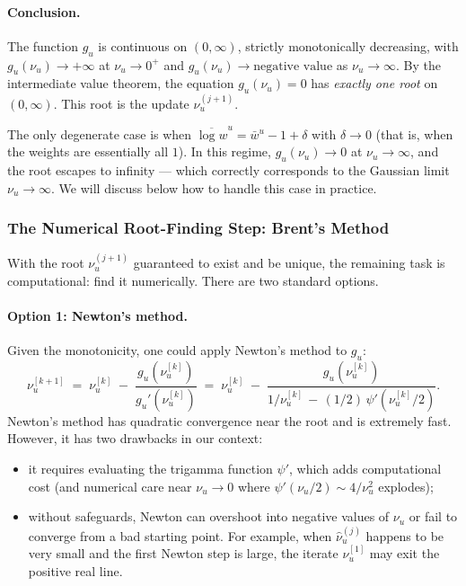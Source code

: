 \documentclass[11pt, a4paper, oneside]{article}
\begin{document}
\paragraph{Conclusion.}
The function $g_u$ is continuous on $(0, \infty)$, strictly
monotonically decreasing, with $g_u(\nu_u) \to +\infty$ at $\nu_u \to 0^+$
and $g_u(\nu_u) \to \text{negative value}$ as $\nu_u \to \infty$. By
the intermediate value theorem, the equation $g_u(\nu_u) = 0$ has
\emph{exactly one root} on $(0, \infty)$. This root is the update
$\nu_u^{(j+1)}$.

The only degenerate case is when $\overline{\log w}^u = \bar{w}^u - 1 + \delta$
with $\delta \to 0$ (that is, when the weights are essentially all
$1$). In this regime, $g_u(\nu_u) \to 0$ at $\nu_u \to \infty$, and the
root escapes to infinity — which correctly corresponds to the
Gaussian limit $\nu_u \to \infty$. We will discuss below how to handle
this case in practice.

\subsubsection{The Numerical Root-Finding Step: Brent's Method}

With the root $\nu_u^{(j+1)}$ guaranteed to exist and be unique, the
remaining task is computational: find it numerically. There are two
standard options.

\paragraph{Option 1: Newton's method.}
Given the monotonicity, one could apply Newton's method to $g_u$:
\[
\nu_u^{[k+1]} \;=\; \nu_u^{[k]} \;-\; \frac{g_u(\nu_u^{[k]})}{g_u'(\nu_u^{[k]})}
\;=\; \nu_u^{[k]} \;-\; \frac{g_u(\nu_u^{[k]})}{1/\nu_u^{[k]} \,-\, (1/2)\,\psi'(\nu_u^{[k]}/2)}.
\]
Newton's method has quadratic convergence near the root and is
extremely fast. However, it has two drawbacks in our context:
\begin{itemize}[leftmargin=1.5em, itemsep=2pt]
    \item it requires evaluating the trigamma function $\psi'$, which
          adds computational cost (and numerical care near
          $\nu_u \to 0$ where $\psi'(\nu_u/2) \sim 4/\nu_u^2$ explodes);
    \item without safeguards, Newton can overshoot into negative values
          of $\nu_u$ or fail to converge from a bad starting point.
          For example, when $\hat{\nu}_u^{(j)}$ happens to be very
          small and the first Newton step is large, the iterate
          $\nu_u^{[1]}$ may exit the positive real line.
\end{itemize}
\end{document}
